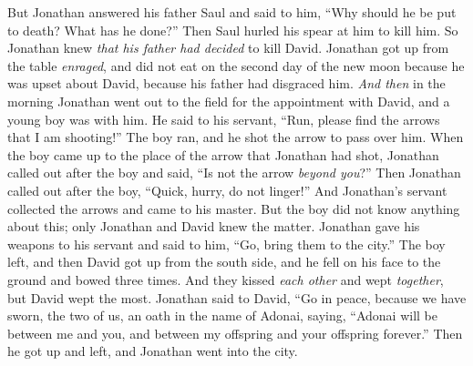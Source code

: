 \begin{biblechapter}
\verse But Jonathan answered his father Saul and said to him, “Why should he be put to death? What has he done?”
\verse Then Saul hurled his spear at him to kill him. So Jonathan knew \textit{that his father had decided} to kill David.
\verse Jonathan got up from the table \textit{enraged}, and did not eat on the second day of the new moon because he was upset about David, because his father had disgraced him.
\verse \textit{And then} in the morning Jonathan went out to the field for the appointment with David, and a young boy was with him.
\verse He said to his servant, “Run, please find the arrows that I am shooting!” The boy ran, and he shot the arrow to pass over him.
\verse When the boy came up to the place of the arrow that Jonathan had shot, Jonathan called out after the boy and said, “Is not the arrow \textit{beyond you}?”
\verse Then Jonathan called out after the boy, “Quick, hurry, do not linger!” And Jonathan’s servant collected the arrows and came to his master.
\verse But the boy did not know anything about this; only Jonathan and David knew the matter.
\verse Jonathan gave his weapons to his servant and said to him, “Go, bring them to the city.”
\verse The boy left, and then David got up from the south side, and he fell on his face to the ground and bowed three times. And they kissed \textit{each other} and wept \textit{together}, but David wept the most.
\verse Jonathan said to David, “Go in peace, because we have sworn, the two of us, an oath in the name of Adonai, saying, “Adonai will be between me and you, and between my offspring and your offspring forever.” Then he got up and left, and Jonathan went into the city.
\end{biblechapter}

